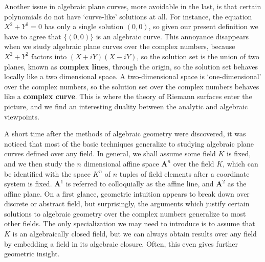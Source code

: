 Another issue in algebraic plane curves, more avoidable in the last, is that certain polynomials do not have `curve-like' solutions at all. For instance, the equation $X^2 + Y^2 = 0$ has only a single solution $(0,0)$, so given our present definition we have to agree that $\{ (0,0) \}$ is an algebraic curve. This annoyance disappears when we study algebraic plane curves over the complex numbers, because $X^2 + Y^2$ factors into $(X + iY)(X - iY)$, so the solution set is the union of two planes, known as {\bf complex lines}, through the origin, so the solution set behaves locally like a two dimensional space. A two-dimensional space is `one-dimensional' over the complex numbers, so the solution set over the complex numbers behaves like a {\bf complex curve}. This is where the theory of Riemann surfaces enter the picture, and we find an interesting duality between the analytic and algebraic viewpoints.

A short time after the methods of algebraic geometry were discovered, it was noticed that most of the basic techniques generalize to studying algebraic plane curves defined over any field. In general, we shall assume some field $K$ is fixed, and we then study the $n$ dimensional affine space $\mathbf{A}^n$ over the field $K$, which can be identified with the space $K^n$ of $n$ tuples of field elements after a coordinate system is fixed. $\mathbf{A}^1$ is referred to colloquially as the affine line, and $\mathbf{A}^2$ as the affine plane. On a first glance, geometric intuition appears to break down over discrete or abstract field, but surprisingly, the arguments which justify certain solutions to algebraic geometry over the complex numbers generalize to most other fields. The only specialization we may need to introduce is to assume that $K$ is an algebraically closed field, but we can always obtain results over any field by embedding a field in its algebraic closure. Often, this even gives further geometric insight.

